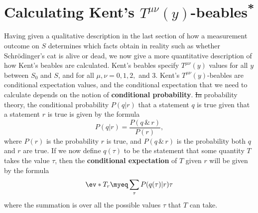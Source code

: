 \documentclass[12pt]{report}
\providecommand{\DIFadd}[1]{{\protect\color{blue}\uwave{#1}}} %
\providecommand{\DIFdel}[1]{{\protect\color{red}\sout{#1}}}                      %
\providecommand{\DIFaddbegin}{} %
\providecommand{\DIFaddend}{} %
\providecommand{\DIFdelbegin}{} %
\providecommand{\DIFdelend}{} %
\begin{document}


\section{Calculating Kent's $T^{\mu\nu}(y)$-beables\textsuperscript{*} \label{kentcalculation}}
Having given a qualitative description in the last section of how a measurement outcome on $S$ determines which facts obtain in reality such as whether Schr\"{o}dinger's cat is alive or dead, we now give a more quantitative description of how Kent's beables are calculated. Kent's beables specify $T^{\mu\nu}(y)$ values for all $y$ between $S_0$ and $S$, and for all $\mu,\nu = 0, 1, 2,$ and $3$. Kent's $T^{\mu\nu}(y)$-beables are conditional expectation values, and the conditional expectation that we need to calculate depends on the notion of \textbf{conditional probability}. \DIFdelbegin \DIFdel{In }\DIFdelend \DIFaddbegin \DIFadd{Recall that in }\DIFaddend probability theory, the conditional probability $P(q|r)$  %
%
that a statement $q$ is true given that a statement $r$ is true is given by the formula
\begin{equation} \label{conditionalprobability}
  P(q|r)=\frac{P(q\, \&\,  r)}{P(r)},
\end{equation} 
where $P(r)$  %
%
is the probability $r$ is true, and $P(q\, \&\,  r)$ is the probability both $q$ and $r$ are true.
If we now define $q(\tau)$ to be %
\DIFdelbegin %
\DIFdelend \DIFaddbegin {}\DIFaddend %
 the statement that some quantity $T$  takes the value $\tau$, then the  \textbf{conditional expectation} of  $T$ given $r$ will be given by the formula
\begin{equation}\label{conditionalexpectation}
\ev*{T}_r\myeq\sum_\tau P(q(\tau)|r)\tau
\end{equation} %
%
where the summation is over all the possible values $\tau$ that $T$ can take.
\end{document}
